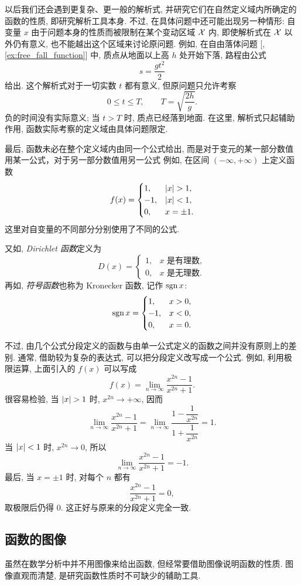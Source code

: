 以后我们还会遇到更复杂、更一般的解析式,
并研究它们在自然定义域内所确定的函数的性质, 即研究解析工具本身.
不过, 在具体问题中还可能出现另一种情形:
自变量 $x$ 由于问题本身的性质而被限制在某个变动区域 $\mathcal{X}$ 内,
即使解析式在 $\mathcal{X}$ 以外仍有意义, 也不能越出这个区域来讨论原问题.
例如, 在自由落体问题 [, \ref{ex:free_fall_function}] 中,
质点从地面以上高 $h$ 处开始下落, 路程由公式
$$
s=\frac{gt^2}{2}
$$
给出. 这个解析式对于一切实数 $t$ 都有意义,
但原问题只允许考察
$$
0\leqslant t\leqslant T,\qquad T=\sqrt{\frac{2h}{g}}.
$$
负的时间没有实际意义; 当 $t>T$ 时, 质点已经落到地面.
在这里, 解析式只起辅助作用, 函数实际考察的定义域由具体问题限定.

\myrefparagraph{3\textdegree}\label{par:piecewise_analytic_representation}
最后, 函数未必在整个定义域内由同一个公式给出,
而是对于变元的某一部分数值用某一公式，对于另一部分数值用另一公式
例如, 在区间 $(-\infty,+\infty)$ 上定义函数
$$
f(x)=
\begin{cases}
1, & \abs{x}>1,\\
-1, & \abs{x}<1,\\
0, & x=\pm1.
\end{cases}
$$
这里对自变量的不同部分分别使用了不同的公式.

又如, \emph{Dirichlet 函数}定义为
$$
D(x)=
\begin{cases}
1, & x\text{ 是有理数},\\
0, & x\text{ 是无理数}.
\end{cases}
$$
再如, \emph{符号函数}也称为 Kronecker 函数, 记作 $\operatorname{sgn} x$:
$$
\operatorname{sgn} x=
\begin{cases}
1, & x>0,\\
-1, & x<0,\\
0, & x=0.
\end{cases}
$$

不过, 由几个公式分段定义的函数与由单一公式定义的函数之间并没有原则上的差别.
通常, 借助较为复杂的表达式, 可以把分段定义改写成一个公式.
例如, 利用极限运算, 上面引入的 $f(x)$ 可以写成
$$
f(x)=\lim_{n\to\infty}\frac{x^{2n}-1}{x^{2n}+1}.
$$
很容易检验, 当 $\abs{x}>1$ 时, $x^{2n}\to+\infty$, 因而
$$
\lim_{n\to\infty}\frac{x^{2n}-1}{x^{2n}+1}
=\lim_{n\to\infty}\frac{1-\dfrac{1}{x^{2n}}}{1+\dfrac{1}{x^{2n}}}=1.
$$
当 $\left| x \right|<1$ 时, $x^{2n}\to0$, 所以
$$
\lim_{n\to\infty}\frac{x^{2n}-1}{x^{2n}+1}=-1.
$$
最后, 当 $x=\pm1$ 时, 对每个 $n$ 都有
$$
\frac{x^{2n}-1}{x^{2n}+1}=0,
$$
取极限后仍得 $0$. 这正好与原来的分段定义完全一致.

\subsection{函数的图像}\label{subsec:47}
虽然在数学分析中并不用图像来给出函数,
但经常要借助图像说明函数的性质.
图像直观而清楚, 是研究函数性质时不可缺少的辅助工具.

